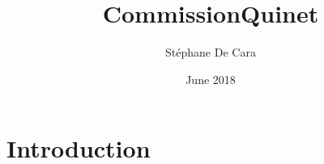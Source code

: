 \documentclass{article}
\title{CommissionQuinet}
\author{Stéphane De Cara}
\date{June 2018}
\begin{document}
\maketitle

\section{Introduction}
\end{document}
